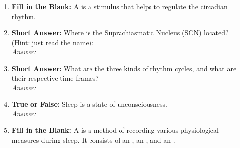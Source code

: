 \begin{enumerate}[label = \textbf{Q4.4.\arabic*}]
    \item \textbf{Fill in the Blank:} A \underline{\hspace{3cm}} is a stimulus that helps to regulate the circadian rhythm.

    \item \textbf{Short Answer:} Where is the Suprachiasmatic Nucleus (SCN) located? (Hint: just read the name): \\
          \textit{Answer:} \\ %

    \item \textbf{Short Answer:} What are the three kinds of rhythm cycles, and what are their respective time frames? \\
          \textit{Answer:} \\ %

    \item \textbf{True or False:} Sleep is a state of unconsciousness. \\
          \textit{Answer:} \\ %

    \item \textbf{Fill in the Blank:} A \underline{\hspace{3cm}} is a method of recording various physiological measures during sleep. It consists of an \underline{\hspace{3cm}}, an \underline{\hspace{3cm}}, and an \underline{\hspace{3cm}}.


\end{enumerate}
